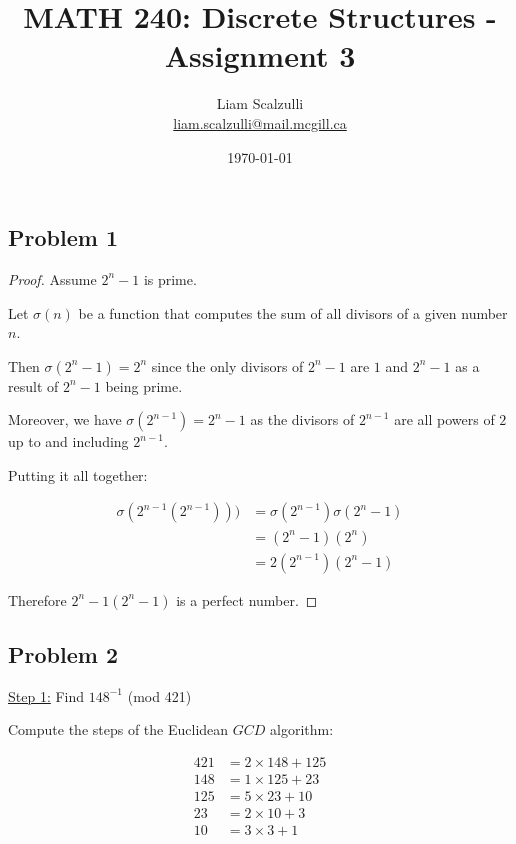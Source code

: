 \documentclass[10pt]{article}
\title{MATH 240: Discrete Structures - Assignment 3}
\author{Liam Scalzulli\\
\href{mailto:liam.scalzulli@mail.mcgill.ca}{liam.scalzulli@mail.mcgill.ca}}
\date{\today}
\begin{document}
\maketitle

\subsection*{Problem 1}

\begin{proof}
  Assume $2^n - 1$ is prime. \spacing

  \noindent
  Let $\sigma(n)$ be a function that computes the sum of all divisors of a given
  number $n$.
  \spacing

  \noindent
  Then $\sigma(2^n - 1) = 2^n$ since the only divisors of $2^n - 1$ are $1$ and $2 ^ n - 1$ as a result
  of $2^n - 1$ being prime.
  \spacing

  \noindent
  Moreover, we have $\sigma(2^{n - 1}) = 2^n - 1$ as the divisors of $2^{n - 1}$ are all powers of $2$ up to
  and including $2^{n - 1}$.
  \spacing

  \noindent
  Putting it all together:

  \begin{align*}
    \sigma(2^{n - 1}(2^{n - 1}))) &= \sigma(2^{n - 1})\sigma(2^n - 1) \\
      &= (2^n - 1)(2^n) \\
      &= 2(2^{n - 1})(2^n - 1)
  \end{align*}

  \noindent
  Therefore $2^n-1(2^n - 1)$ is a perfect number.
\end{proof}

\newpage
\subsection*{Problem 2}

\underline{Step 1:} Find $148^{-1}$ (mod 421)
\spacing

\noindent
Compute the steps of the Euclidean $GCD$ algorithm:

\begin{align*}
  421 &= 2 \times 148 + 125 \\
  148 &= 1 \times 125 + 23 \\
  125 &= 5 \times 23 + 10 \\
  23 &= 2 \times 10 + 3 \\
  10 &= 3 \times 3 + 1
\end{align*}
\end{document}
